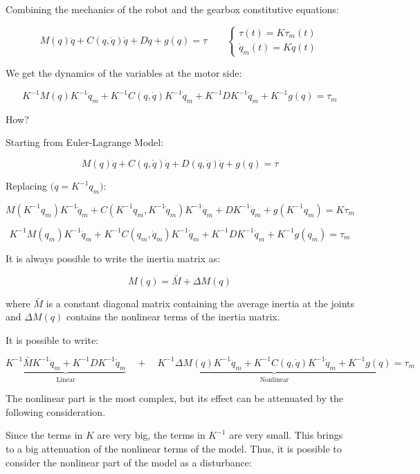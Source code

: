\hfill

Combining the mechanics of the robot and the gearbox constitutive equations:

\[
M(q)\ddot{q} + C(q,\dot{q})\dot{q} + D\dot{q} + g(q) = \tau
\quad\quad
\begin{cases}
\tau(t) = K \tau_m(t) \\
\dot{q}_m(t) = K \dot{q}(t)
\end{cases}
\]

We get the dynamics of the variables at the motor side:

\[
K^{-1}M(q)K^{-1}\ddot{q}_m + K^{-1}C(q,\dot{q})K^{-1}\dot{q}_m + K^{-1}D K^{-1}\dot{q}_m + K^{-1} g(q) = \tau_m
\]

How?

Starting from Euler-Lagrange Model:

\[
M(q)\ddot{q} + C(q,\dot{q})\dot{q} + D(q,\dot{q})\dot{q} + g(q) = \tau
\]

Replacing $\big(q = K^{-1} q_m \big)$:

\[
M\!\left(K^{-1} q_m\right) K^{-1} \ddot{q}_m 
+ C\!\left(K^{-1} q_m, K^{-1}\dot{q}_m\right) K^{-1}\dot{q}_m 
+ D K^{-1}\dot{q}_m 
+ g\!\left(K^{-1} q_m\right) 
= K \tau_m
\]

\[
K^{-1} M(q_m) K^{-1} \ddot{q}_m 
+ K^{-1} C(q_m,\dot{q}_m) K^{-1}\dot{q}_m 
+ K^{-1} D K^{-1}\dot{q}_m 
+ K^{-1} g(q_m) 
= \tau_m
\]

\hfill

It is always possible to write the inertia matrix as:  

\[
M(q) = \bar{M} + \Delta M(q)
\]

where $\bar{M}$ is a constant diagonal matrix containing the average inertia at the joints and $\Delta M(q)$ contains the nonlinear terms of the inertia matrix.  

It is possible to write:

\[
\underbrace{K^{-1}\bar{M}K^{-1}\ddot{q}_m + K^{-1}D K^{-1}\dot{q}_m}_{\text{Linear}} 
\quad + \quad 
\underbrace{K^{-1}\Delta M(q)K^{-1}\ddot{q}_m + K^{-1}C(q,\dot{q})K^{-1}\dot{q}_m + K^{-1}g(q)}_{\text{Nonlinear}}
= \tau_m
\]

The nonlinear part is the most complex, but its effect can be attenuated by the following consideration.

Since the terms in $K$ are very big, the terms in $K^{-1}$ are very small. This brings to a big attenuation of the nonlinear terms of the model. Thus, it is possible to consider the nonlinear part of the model as a disturbance:  

